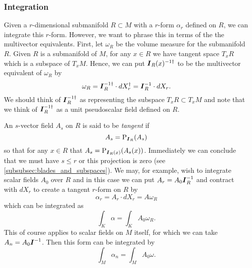 \subsubsection{Integration}
\label{subsubsec:integration_on_submanifolds}

Given a $r$-dimensional submanifold $R \subset M$ with a $r$-form $\alpha_r$ defined on $R$, we can integrate this $r$-form. However, we want to phrase this in terms of the the multivector equivalents.  First, let $\omega_R$ be the volume measure for the submanifold $R$.  Given $R$ is a submanifold of $M$, for any $x \in R$ we have tangent space $T_x R$ which is a subspace of $T_x M$. Hence, we can put $\boldsymbol{I}_R(x)^{-1 \dagger}$ to be the multivector equivalent of $\omega_R$ by
\begin{equation}
\omega_R = \boldsymbol{I}_R^{-1 \dagger} \cdot dX_r^\dagger = \boldsymbol{I}_R^{-1} \cdot dX_r.
\end{equation}
We should think of $\boldsymbol{I}_R^{-1 \dagger}$ as representing the subspace $T_x R \subset T_x M$ and note that we think of $\boldsymbol{I}_R^{-1 \dagger}$ as a unit pseudoscalar field defined on $R$. 

An $s$-vector field $A_s$ on $R$ is said to be \emph{tangent} if
\begin{equation}
A_s = \operatorname{P}_{\boldsymbol{I}_R}(A_s)
\end{equation} 
so that for any $x \in R$ that $A_s = \operatorname{P}_{\boldsymbol{I}_R(x)}(A_s(x))$. Immediately we can conclude that we must have $s\leq r$ or this projection is zero (see \cref{subsubsec:blades_and_subspaces}). We may, for example, wish to integrate scalar fields $A_0$ over $R$ and in this case we can put $A_r = A_0 \boldsymbol{I}_R^{-1}$ and contract with $dX_r$ to create a tangent $r$-form on $R$ by 
\begin{equation}
\alpha_r = A_r \cdot dX_r = A \omega_R
\end{equation}
which can be integrated as
\begin{equation}
\int_K \alpha = \int_K A_0 \omega_R.
\end{equation}
This of course applies to scalar fields on $M$ itself, for which we can take $A_n = A_0 \boldsymbol{I}^{-1}$. Then this form can be integrated by
\begin{equation}
\int_M \alpha_n = \int_M A_0 \omega.
\end{equation}

